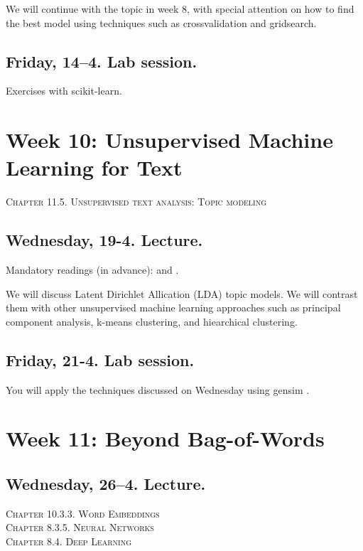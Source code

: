 We will continue with the topic in week 8, with special attention on how to find the best model using techniques such as crossvalidation and gridsearch.


\subsection*{Friday, 14--4. Lab session.}
Exercises with scikit-learn.



\section*{Week 10: Unsupervised Machine Learning for Text}
\textsc{ Chapter 11.5. Unsupervised text analysis: Topic modeling}\\

\subsection*{Wednesday, 19-4. Lecture.}
Mandatory readings (in advance): \cite{Maier2018a} and \cite{Tsur2015}.

We will discuss Latent Dirichlet Allication (LDA) topic models. We will contrast them with other unsupervised machine learning approaches such as principal component analysis, k-means clustering, and hiearchical clustering.


\subsection*{Friday, 21-4. Lab session.}
You will apply the techniques discussed on Wednesday using gensim \citep{Rehurek2010}.






\section*{Week 11: Beyond Bag-of-Words}

\subsection*{Wednesday, 26--4. Lecture.}


\textsc{ Chapter 10.3.3. Word Embeddings}\\
\textsc{ Chapter 8.3.5. Neural Networks}\\
\textsc{ Chapter 8.4. Deep Learning}\\

